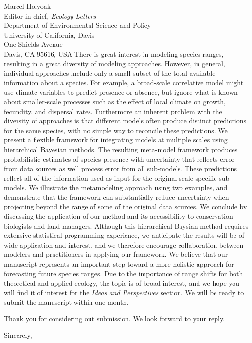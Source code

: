 \documentclass[11pt]{letter}
\makeatletter
\renewcommand{\closing}[1]{\par\nobreak\vspace{\parskip}%
  \stopbreaks
  \noindent
  \ifx\@empty\fromaddress\else
  \hspace*{\longindentation}\fi
  \parbox{\indentedwidth}{\raggedright
       \ignorespaces #1\\[1\medskipamount]%
       \ifx\@empty\fromsig
           \fromname
       \else \fromsig \fi\strut}%
   \par}
\makeatother
\begin{document}
\begin{letter}{Marcel Holyoak \\ 
	Editor-in-chief, \emph{Ecology Letters} \\ 
	Department of Environmental Science and Policy \\
	University of California, Davis \\
	One Shields Avenue \\
	Davis, CA 95616, USA }
There is great interest in modeling species ranges, resulting in a great diversity of modeling approaches.
However, in general, individual approaches include only a small subset of the total available information about a species. 
For example, a broad-scale correlative model might use climate variables to predict presence or absence, but ignore what is known about smaller-scale processes such as the effect of local climate on growth, fecundity, and dispersal rates.
Furthermore an inherent problem with the diversity of approaches is that different models often produce distinct predictions for the same species, with no simple way to reconcile these predictions.
We present a flexible framework for integrating models at multiple scales using hierarchical Bayesian methods. 
The resulting meta-model framework produces probabilistic estimates of species presence with uncertainty that reflects error from data sources as well process error from all sub-models.
 These predictions reflect all of the information used as input for the original scale-specific sub-models.
We illustrate the metamodeling approach using two examples, and demonstrate that the framework can substantially reduce uncertainty when projecting beyond the range of some of the original data sources.
We conclude by discussing the application of our method and its accessibility to conservation biologists and land managers.
Although this hierarchical Baysian method requires extensive statistical programming experience, we anticipate the results will be of wide application and interest, and we therefore encourage collaboration between modelers and practitioners in applying our framework.
We believe that our manuscript represents an important step toward a more holistic approach for forecasting future species ranges.
Due to the importance of range shifts for both theoretical and applied ecology, the topic is of broad interest, and we hope you will find it of interest for the \emph{Ideas and Perspectives} section.
We will be ready to submit the manuscript within one month.

Thank you for considering out submission. We look forward to your reply.

\closing{Sincerely,}

\end{letter}
\end{document}
